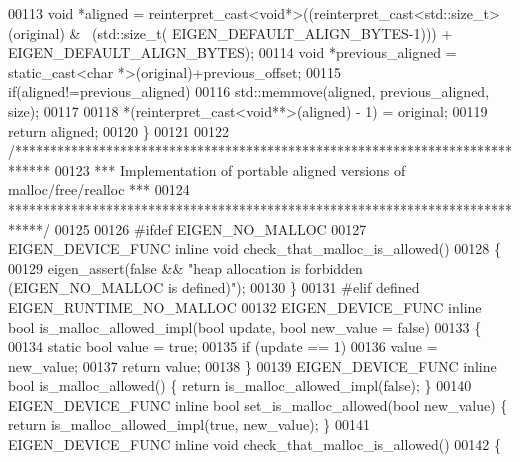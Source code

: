\begin{DoxyCode}
{00113   \textcolor{keywordtype}{void} *aligned = \textcolor{keyword}{reinterpret\_cast<}\textcolor{keywordtype}{void}*\textcolor{keyword}{>}((\textcolor{keyword}{reinterpret\_cast<}std::size\_t\textcolor{keyword}{>}(original) & ~(std::size\_t(
      EIGEN\_DEFAULT\_ALIGN\_BYTES-1))) + EIGEN\_DEFAULT\_ALIGN\_BYTES);
00114   \textcolor{keywordtype}{void} *previous\_aligned = \textcolor{keyword}{static\_cast<}\textcolor{keywordtype}{char} *\textcolor{keyword}{>}(original)+previous\_offset;
00115   \textcolor{keywordflow}{if}(aligned!=previous\_aligned)
00116     std::memmove(aligned, previous\_aligned, size);
00117   
00118   *(\textcolor{keyword}{reinterpret\_cast<}\textcolor{keywordtype}{void}**\textcolor{keyword}{>}(aligned) - 1) = original;
00119   \textcolor{keywordflow}{return} aligned;
00120 \}
00121 
00122 \textcolor{comment}{/*****************************************************************************}
00123 \textcolor{comment}{*** Implementation of portable aligned versions of malloc/free/realloc     ***}
00124 \textcolor{comment}{*****************************************************************************/}
00125 
00126 \textcolor{preprocessor}{#ifdef EIGEN\_NO\_MALLOC}
00127 EIGEN\_DEVICE\_FUNC \textcolor{keyword}{inline} \textcolor{keywordtype}{void} check\_that\_malloc\_is\_allowed()
00128 \{
00129   eigen\_assert(\textcolor{keyword}{false} && \textcolor{stringliteral}{"heap allocation is forbidden (EIGEN\_NO\_MALLOC is defined)"});
00130 \}
00131 \textcolor{preprocessor}{#elif defined EIGEN\_RUNTIME\_NO\_MALLOC}
00132 EIGEN\_DEVICE\_FUNC \textcolor{keyword}{inline} \textcolor{keywordtype}{bool} is\_malloc\_allowed\_impl(\textcolor{keywordtype}{bool} update, \textcolor{keywordtype}{bool} new\_value = \textcolor{keyword}{false})
00133 \{
00134   \textcolor{keyword}{static} \textcolor{keywordtype}{bool} value = \textcolor{keyword}{true};
00135   \textcolor{keywordflow}{if} (update == 1)
00136     value = new\_value;
00137   \textcolor{keywordflow}{return} value;
00138 \}
00139 EIGEN\_DEVICE\_FUNC \textcolor{keyword}{inline} \textcolor{keywordtype}{bool} is\_malloc\_allowed() \{ \textcolor{keywordflow}{return} is\_malloc\_allowed\_impl(\textcolor{keyword}{false}); \}
00140 EIGEN\_DEVICE\_FUNC \textcolor{keyword}{inline} \textcolor{keywordtype}{bool} set\_is\_malloc\_allowed(\textcolor{keywordtype}{bool} new\_value) \{ \textcolor{keywordflow}{return} is\_malloc\_allowed\_impl(\textcolor{keyword}{true}, 
      new\_value); \}
00141 EIGEN\_DEVICE\_FUNC \textcolor{keyword}{inline} \textcolor{keywordtype}{void} check\_that\_malloc\_is\_allowed()
00142 \{
}
\end{DoxyCode}

